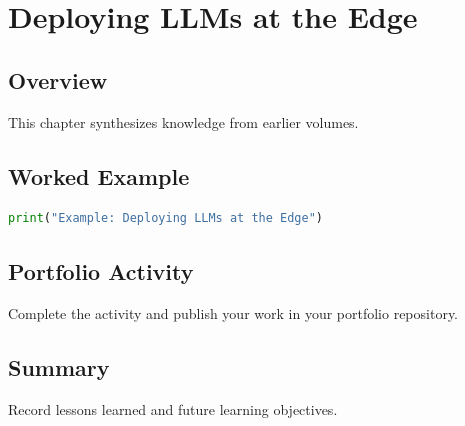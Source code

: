 \chapter{Deploying LLMs at the Edge}
\label{chap:vol15-3}



\section{Overview}
This chapter synthesizes knowledge from earlier volumes.

\section{Worked Example}
\begin{lstlisting}[language=Python]
print("Example: Deploying LLMs at the Edge")
\end{lstlisting}

\section{Portfolio Activity}
Complete the activity and publish your work in your portfolio repository.

\section{Summary}
Record lessons learned and future learning objectives.
